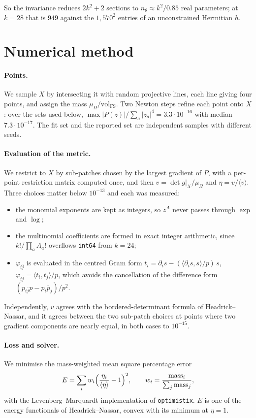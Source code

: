 \documentclass[11pt,a4paper]{article}
\newcommand{\FS}{\mathrm{FS}}
\begin{document}
\noindent
So the invariance reduces $2k^2+2$ sections to $n_\theta\approx k^2/0.85$ real
parameters; at $k=28$ that is $949$ against the $1{,}570^2$ entries of an
unconstrained Hermitian $h$.

\section{Numerical method}

\paragraph{Points.}
We sample $X$ by intersecting it with random projective lines, each line giving
four points, and assign the mass $\mu_\Omega/\mathrm{vol}_\FS$. Two Newton steps
refine each point onto $X$: over the sets used below,
$\max|P(z)|/\sum_a|z_a|^4=3.3\cdot10^{-16}$ with median $7.3\cdot10^{-17}$.
The fit set and the reported set are independent samples with different seeds.

\paragraph{Evaluation of the metric.}
We restrict to $X$ by sub-patches chosen by the largest gradient of $P$, with a
per-point restriction matrix computed once, and then
$v=\det g|_X/\mu_\Omega$ and $\eta=v/\langle v\rangle$. Three choices matter
below $10^{-13}$ and each was measured:
\begin{itemize}
  \item the monomial exponents are kept as integers, so $z^A$ never passes
        through $\exp$ and $\log$;
  \item the multinomial coefficients are formed in exact integer arithmetic,
        since $k!/\prod_a A_a!$ overflows \texttt{int64} from $k=24$;
  \item $\varphi_{i\bar j}$ is evaluated in the centred Gram form
        $t_i=\partial_i s-(\langle\partial_i s,s\rangle/p)\,s$,
        $\varphi_{i\bar j}=\langle t_i,t_j\rangle/p$, which avoids the
        cancellation of the difference form $(p_{i\bar j}p-p_i\bar p_j)/p^2$.
\end{itemize}
Independently, $v$ agrees with the bordered-determinant formula of
Headrick--Nassar, and it agrees between the two sub-patch choices at points where
two gradient components are nearly equal, in both cases to $10^{-15}$.

\paragraph{Loss and solver.}
We minimise the mass-weighted mean square percentage error
\begin{equation}
  E=\sum_i w_i\Bigl(\frac{\eta_i}{\langle\eta\rangle}-1\Bigr)^2,
  \qquad
  w_i=\frac{\text{mass}_i}{\sum_j \text{mass}_j},
  \label{eq:loss}
\end{equation}
with the Levenberg--Marquardt implementation of \texttt{optimistix}. $E$ is one
of the energy functionals of Headrick--Nassar, convex with its minimum at
$\eta=1$.
\end{document}
